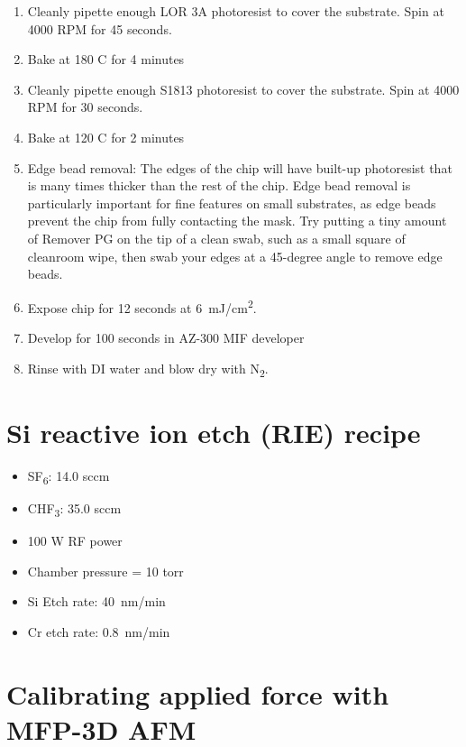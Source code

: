 \documentclass{beavtex_dub_edit}
\begin{document}
\begin{enumerate}
    \item Cleanly pipette enough LOR 3A photoresist to cover the substrate. Spin at 4000 RPM for 45 seconds.
    \item Bake at 180 C for 4 minutes
    \item Cleanly pipette enough S1813 photoresist to cover the substrate. Spin at 4000 RPM for 30 seconds.
    \item Bake at 120 C for 2 minutes
    \item Edge bead removal: The edges of the chip will have built-up photoresist that is many times thicker than the rest of the chip. Edge bead removal is particularly important for fine features on small substrates, as edge beads prevent the chip from fully contacting the mask. Try putting a tiny amount of Remover PG on the tip of a clean swab, such as a small square of cleanroom wipe, then swab your edges at a 45-degree angle to remove edge beads. 
    \item Expose chip for 12 seconds at \SI{6}{\milli\joule/\centi\meter^2}.
    \item Develop for 100 seconds in AZ-300 MIF developer
    \item Rinse with DI water and blow dry with N\textsubscript{2}.
\end{enumerate}

\section{Si reactive ion etch (RIE) recipe}\label{Si RIE recipe}

\begin{itemize}
    \item SF\textsubscript{6}: 14.0 sccm
    \item CHF\textsubscript{3}: 35.0 sccm
    \item 100 W RF power
    \item Chamber pressure = 10 torr
    \item Si Etch rate: \SI{40}{\nano\meter/\minute}
    \item Cr etch rate: \SI{0.8}{\nano\meter/\minute}

\end{itemize}


\section{Calibrating applied force with MFP-3D AFM} \label{force curve appendix}
\end{document}
